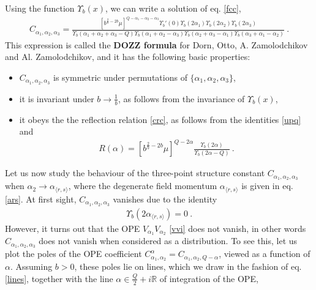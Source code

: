 \documentclass[12pt,a4paper,notitlepage]{report}
\numberwithin{equation}{section}
\theoremstyle{break}
\begin{document}
Using the function $\Upsilon_b(x)$, we can write a solution of eq. \eqref{fcc},
\begin{align}
 \boxed{C_{\alpha_1,\alpha_2,\alpha_3} =  \frac{\left[b^{\frac{2}{b}-2b}\mu\right]^{Q-\alpha_1-\alpha_2-\alpha_3}\Upsilon_b'(0) \Upsilon_b(2\alpha_1) \Upsilon_b(2\alpha_2) \Upsilon_b(2\alpha_3)}{\Upsilon_b(\alpha_1+\alpha_2+\alpha_3-Q) \Upsilon_b(\alpha_1+\alpha_2-\alpha_3)\Upsilon_b(\alpha_2+\alpha_3-\alpha_1)\Upsilon_b(\alpha_3+\alpha_1-\alpha_2)}} \ .
\label{caaa}
\end{align}
This expression is called the \textbf{\boldmath DOZZ formula} for Dorn, Otto, A.
Zamolodchikov and Al.
Zamolodchikov, and it has the following basic properties:
\begin{itemize}
 \item $C_{\alpha_1,\alpha_2,\alpha_3}$ is symmetric under permutations of $\{\alpha_1,\alpha_2,\alpha_3\}$, 
\item it is invariant under $b\rightarrow \frac{1}{b}$, as follows from the invariance of $\Upsilon_b(x)$,
\item it obeys the the reflection relation \eqref{crc}, as follows from the identities \eqref{upq} and 
\begin{align}
 R(\alpha)=\left[b^{\frac{2}{b}-2b}\mu\right]^{Q-2\alpha}\frac{\Upsilon_b(2\alpha)}{\Upsilon_b(2\alpha-Q)}\ .
\end{align}
\end{itemize}
Let us now study the behaviour of the three-point structure constant $C_{\alpha_1,\alpha_2,\alpha_3}$ when $\alpha_2 \rightarrow \alpha_{\langle r,s \rangle}$, where the degenerate field momentum $\alpha_{\langle r,s \rangle}$ is given in eq. \eqref{ars}.
At first sight, $C_{\alpha_1,\alpha_2,\alpha_3}$ vanishes due to the identity 
\begin{align}
 \Upsilon_b(2\alpha_{\langle r,s \rangle})=0\ .
\label{ubt}
\end{align}
However, it turns out that the OPE $V_{\alpha_1}V_{\alpha_2}$ \eqref{vvi} does not vanish, in other words $C_{\alpha_1,\alpha_2,\alpha_3}$ does not vanish when considered as a distribution.
To see this, let us plot the poles of the OPE coefficient $C_{\alpha_1,\alpha_2}^\alpha = C_{\alpha_1,\alpha_2,Q-\alpha}$, viewed as a function of $\alpha$.
Assuming $b>0$, these poles lie on lines, which we draw in the fashion of eq. \eqref{lines}, together with the line $\alpha\in \frac{Q}{2}+i{\mathbb{R}}$ of integration of the OPE, 
\end{document}
